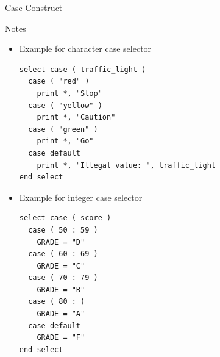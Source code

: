 \documentclass[10pt,t]{beamer}
\begin{document}
\begin{frame}{Case Construct}
\begin{ablock}{Notes}
\begin{itemize}
    \end{itemize}
  \end{ablock}
  \framebreak
  \begin{itemize}
    \item Example for character case selector
      \begin{lstlisting}[language={[90]Fortran},basicstyle=\fontsize{6}{7}\selectfont\ttfamily]
select case ( traffic_light )
  case ( "red" )
    print *, "Stop"
  case ( "yellow" )
    print *, "Caution"
  case ( "green" )
    print *, "Go"
  case default
    print *, "Illegal value: ", traffic_light
end select 
      \end{lstlisting}
    \item Example for integer case selector
      \begin{lstlisting}[language={[90]Fortran},basicstyle=\fontsize{6}{7}\selectfont\ttfamily]
select case ( score )
  case ( 50 : 59 )
    GRADE = "D"
  case ( 60 : 69 )
    GRADE = "C"
  case ( 70 : 79 )
    GRADE = "B"
  case ( 80 : ) 
    GRADE = "A"
  case default
    GRADE = "F"
end select
      \end{lstlisting}
  \end{itemize}
\end{frame}
  
\end{document}
